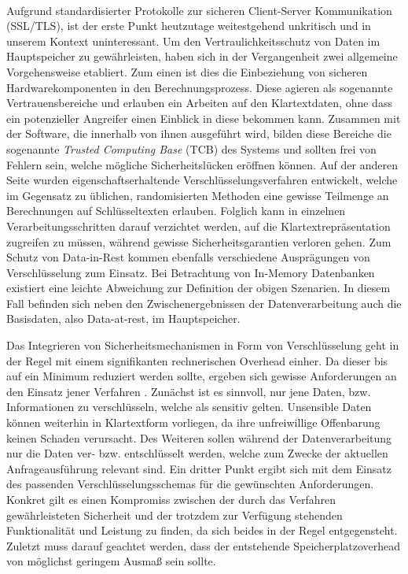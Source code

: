 \paragraph{}
Aufgrund standardisierter Protokolle zur sicheren Client-Server Kommunikation (SSL/TLS), ist der erste Punkt heutzutage weitestgehend unkritisch und in unserem Kontext uninteressant. Um den Vertraulichkeitsschutz von Daten im Hauptspeicher zu gewährleisten, haben sich in der Vergangenheit zwei allgemeine Vorgehensweise etabliert. Zum einen ist dies die Einbeziehung von sicheren Hardwarekomponenten in den Berechnungsprozess. Diese agieren als sogenannte Vertrauensbereiche und erlauben ein Arbeiten auf den Klartextdaten, ohne dass ein potenzieller Angreifer einen Einblick in diese bekommen kann. Zusammen mit der Software, die innerhalb von ihnen ausgeführt wird, bilden diese Bereiche die sogenannte \textit{Trusted Computing Base} (TCB) des Systems und sollten frei von Fehlern sein, welche mögliche Sicherheitslücken eröffnen können. Auf der anderen Seite wurden eigenschaftserhaltende Verschlüsselungsverfahren entwickelt, welche im Gegensatz zu üblichen, randomisierten Methoden eine gewisse Teilmenge an Berechnungen auf Schlüsseltexten erlauben. Folglich kann in einzelnen Verarbeitungsschritten darauf verzichtet werden, auf die Klartextrepräsentation zugreifen zu müssen, während gewisse Sicherheitsgarantien verloren gehen. Zum Schutz von Data-in-Rest kommen ebenfalls verschiedene Ausprägungen von Verschlüsselung zum Einsatz. Bei Betrachtung von In-Memory Datenbanken existiert eine leichte Abweichung zur Definition der obigen Szenarien. In diesem Fall befinden sich neben den Zwischenergebnissen der Datenverarbeitung auch die Basisdaten, also Data-at-rest, im Hauptspeicher.

Das Integrieren von Sicherheitsmechanismen in Form von Verschlüsselung geht in der Regel mit einem signifikanten rechnerischen Overhead einher. Da dieser bis auf ein Minimum reduziert werden sollte, ergeben sich gewisse Anforderungen an den Einsatz jener Verfahren \cite{Shmueli2010}. Zunächst ist es sinnvoll, nur jene Daten, bzw. Informationen zu verschlüsseln, welche als sensitiv gelten. Unsensible Daten können weiterhin in Klartextform vorliegen, da ihre unfreiwillige Offenbarung keinen Schaden verursacht. Des Weiteren sollen während  der Datenverarbeitung nur die Daten ver- bzw. entschlüsselt werden, welche zum Zwecke der aktuellen Anfrageausführung relevant sind. Ein dritter Punkt ergibt sich mit dem Einsatz des passenden Verschlüsselungsschemas für die gewünschten Anforderungen. Konkret gilt es einen Kompromiss zwischen der durch das Verfahren gewährleisteten Sicherheit und der trotzdem zur Verfügung stehenden Funktionalität und Leistung zu finden, da sich beides in der Regel entgegensteht. Zuletzt muss darauf geachtet werden, dass der entstehende Speicherplatzoverhead von möglichst geringem Ausmaß sein sollte.

